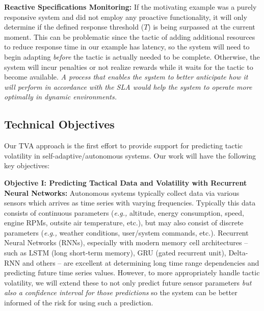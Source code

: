 \documentclass[12pt]{article}
\newcommand{\eg}{\emph{e.g.,}\xspace}
\newcommand{\etc}{etc.\xspace}
\newcommand{\dan}[1]{\textcolor{blue}{{\it [Dan: #1]}}}
\begin{document}
\vspace{1mm} \noindent \textbf{Reactive Specifications Monitoring: }If the motivating example was a purely responsive system and did not employ any proactive functionality, it will only determine if the defined response threshold ($T$) is being surpassed at the current moment. This can be problematic since the tactic of adding additional resources to reduce response time in our example has latency, so the system will need to begin adapting \emph{before} the tactic is actually needed to be complete. Otherwise, the system will incur penalties or not realize rewards while it waits for the tactic to become available. \emph{A process that enables the system to better anticipate how it will perform in accordance with the SLA would help the system to operate more optimally in dynamic environments.}


\subsection{Technical Objectives}

Our TVA approach  is the first effort to provide support for predicting tactic volatility in self-adaptive/autonomous systems. Our work will have the following key objectives:


\vspace{2mm} \noindent \textbf{Objective I: Predicting Tactical Data and Volatility with Recurrent Neural Networks: }Autonomous systems typically collect data via various sensors which arrives as time series with varying frequencies. Typically this data consists of continuous parameters (\eg altitude, energy consumption, speed, engine RPMs, outsite air temperature, \etc), but may also consist of discrete parameters (\eg weather conditions, user/system commands, \etc). Recurrent Neural Networks (RNNs), especially with modern memory cell architectures -- such as LSTM (long short-term memory), GRU (gated recurrent unit), Delta-RNN and others -- are excellent at determining long time range dependencies and predicting future time series values. However, to more appropriately handle tactic volatility, we will extend these to not only predict future sensor parameters \emph{but also a confidence interval for those predictions} so the system can be better informed of the risk for using such a prediction.
\end{document}
